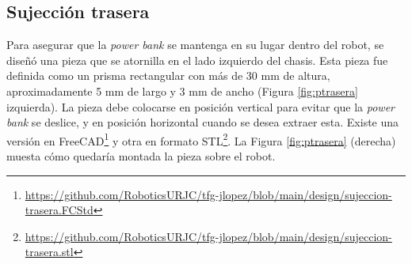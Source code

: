 \subsection{Sujección trasera}
\label{subsec:sujecciontrasera}

Para asegurar que la \textit{power bank} se mantenga en su lugar dentro del robot, se diseñó una pieza que se atornilla en el lado izquierdo del chasis. Esta pieza fue definida como un prisma rectangular con más de 30 mm de altura, aproximadamente 5 mm de largo y 3 mm de ancho (Figura \ref{fig:ptrasera} izquierda). La pieza debe colocarse en posición vertical para evitar que la \textit{power bank} se deslice, y en posición horizontal cuando se desea extraer esta. Existe una versión en FreeCAD\footnote{\url{https://github.com/RoboticsURJC/tfg-jlopez/blob/main/design/sujeccion-trasera.FCStd}} y otra en formato STL\footnote{\url{https://github.com/RoboticsURJC/tfg-jlopez/blob/main/design/sujeccion-trasera.stl}}. La Figura \ref{fig:ptrasera} (derecha) muesta cómo quedaría montada la pieza sobre el robot.



